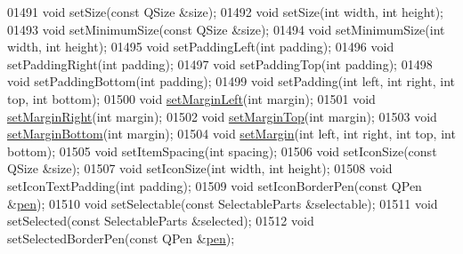 \begin{DoxyCode}
01491   \textcolor{keywordtype}{void} setSize(\textcolor{keyword}{const} QSize &size);
01492   \textcolor{keywordtype}{void} setSize(\textcolor{keywordtype}{int} width, \textcolor{keywordtype}{int} height);
01493   \textcolor{keywordtype}{void} setMinimumSize(\textcolor{keyword}{const} QSize &size);
01494   \textcolor{keywordtype}{void} setMinimumSize(\textcolor{keywordtype}{int} width, \textcolor{keywordtype}{int} height);
01495   \textcolor{keywordtype}{void} setPaddingLeft(\textcolor{keywordtype}{int} padding);
01496   \textcolor{keywordtype}{void} setPaddingRight(\textcolor{keywordtype}{int} padding);
01497   \textcolor{keywordtype}{void} setPaddingTop(\textcolor{keywordtype}{int} padding);
01498   \textcolor{keywordtype}{void} setPaddingBottom(\textcolor{keywordtype}{int} padding);
01499   \textcolor{keywordtype}{void} setPadding(\textcolor{keywordtype}{int} left, \textcolor{keywordtype}{int} right, \textcolor{keywordtype}{int} top, \textcolor{keywordtype}{int} bottom);
01500   \textcolor{keywordtype}{void} \hyperlink{a00116_a3be3a999be642fc336d4f4bf8299b27a}{setMarginLeft}(\textcolor{keywordtype}{int} margin);
01501   \textcolor{keywordtype}{void} \hyperlink{a00116_a1822d02903f715e6910c0b55dd1506b9}{setMarginRight}(\textcolor{keywordtype}{int} margin);
01502   \textcolor{keywordtype}{void} \hyperlink{a00116_a3078bfcda0a3eda7782d8ca01f71ad7e}{setMarginTop}(\textcolor{keywordtype}{int} margin);
01503   \textcolor{keywordtype}{void} \hyperlink{a00116_a87d42c0b0a224f9f9e43013fff4199d9}{setMarginBottom}(\textcolor{keywordtype}{int} margin);
01504   \textcolor{keywordtype}{void} \hyperlink{a00116_a870fac53de3ba7bd9d71b45238b0eaeb}{setMargin}(\textcolor{keywordtype}{int} left, \textcolor{keywordtype}{int} right, \textcolor{keywordtype}{int} top, \textcolor{keywordtype}{int} bottom);
01505   \textcolor{keywordtype}{void} setItemSpacing(\textcolor{keywordtype}{int} spacing);
01506   \textcolor{keywordtype}{void} setIconSize(\textcolor{keyword}{const} QSize &size);
01507   \textcolor{keywordtype}{void} setIconSize(\textcolor{keywordtype}{int} width, \textcolor{keywordtype}{int} height);
01508   \textcolor{keywordtype}{void} setIconTextPadding(\textcolor{keywordtype}{int} padding);
01509   \textcolor{keywordtype}{void} setIconBorderPen(\textcolor{keyword}{const} QPen &\hyperlink{a00116_a1f13fffa0a0faac34ec342973e613a4a}{pen});
01510   \textcolor{keywordtype}{void} setSelectable(\textcolor{keyword}{const} SelectableParts &selectable);
01511   \textcolor{keywordtype}{void} setSelected(\textcolor{keyword}{const} SelectableParts &selected);
01512   \textcolor{keywordtype}{void} setSelectedBorderPen(\textcolor{keyword}{const} QPen &\hyperlink{a00116_a1f13fffa0a0faac34ec342973e613a4a}{pen});

\end{DoxyCode}

